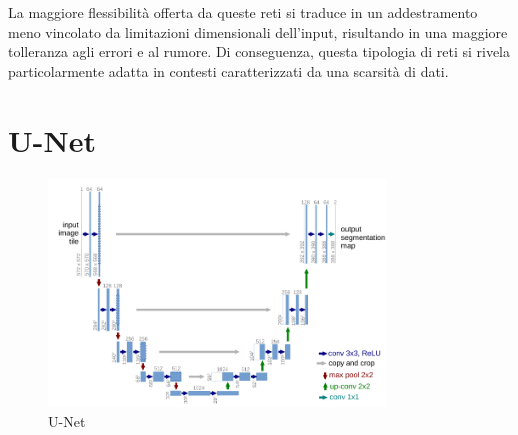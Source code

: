 La maggiore flessibilità offerta da queste reti si traduce in un addestramento meno vincolato da
limitazioni dimensionali dell'input, risultando in una maggiore tolleranza agli errori e al rumore.
Di conseguenza, questa tipologia di reti si rivela particolarmente adatta in contesti caratterizzati
da una scarsità di dati.


\section{U-Net} \label{sec:unet}

\begin{figure}[!ht]
	\begin{center}
		\includegraphics[width=0.8\textwidth]{Immagini/unet.png}
	\end{center}
	\caption{U-Net}\label{fig:unet}
\end{figure}


